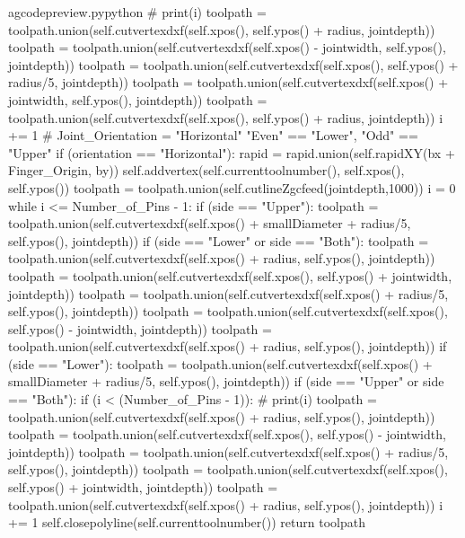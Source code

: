 \documentclass{ltxdoc}
\begin{document}
\begin{writecode}{a}{gcodepreview.py}{python}
    #                    print(i)
                        toolpath = toolpath.union(self.cutvertexdxf(self.xpos(), self.ypos() + radius, jointdepth))
                        toolpath = toolpath.union(self.cutvertexdxf(self.xpos() - jointwidth, self.ypos(), jointdepth))
                        toolpath = toolpath.union(self.cutvertexdxf(self.xpos(), self.ypos() + radius/5, jointdepth))
                        toolpath = toolpath.union(self.cutvertexdxf(self.xpos() + jointwidth, self.ypos(), jointdepth))
                        toolpath = toolpath.union(self.cutvertexdxf(self.xpos(), self.ypos() + radius, jointdepth))
                i += 1
    # Joint_Orientation = "Horizontal" "Even" == "Lower", "Odd" == "Upper"
        if (orientation == "Horizontal"):
            rapid = rapid.union(self.rapidXY(bx + Finger_Origin, by))
            self.addvertex(self.currenttoolnumber(), self.xpos(), self.ypos())
            toolpath = toolpath.union(self.cutlineZgcfeed(jointdepth,1000))
            i = 0
            while i <= Number_of_Pins - 1:
                if (side == "Upper"):
                    toolpath = toolpath.union(self.cutvertexdxf(self.xpos() + smallDiameter + radius/5, self.ypos(), jointdepth))
                if (side == "Lower" or side == "Both"):
                    toolpath = toolpath.union(self.cutvertexdxf(self.xpos() + radius, self.ypos(), jointdepth))
                    toolpath = toolpath.union(self.cutvertexdxf(self.xpos(), self.ypos() + jointwidth, jointdepth))
                    toolpath = toolpath.union(self.cutvertexdxf(self.xpos() + radius/5, self.ypos(), jointdepth))
                    toolpath = toolpath.union(self.cutvertexdxf(self.xpos(), self.ypos() - jointwidth, jointdepth))
                    toolpath = toolpath.union(self.cutvertexdxf(self.xpos() + radius, self.ypos(), jointdepth))
                if (side == "Lower"):
                    toolpath = toolpath.union(self.cutvertexdxf(self.xpos() + smallDiameter + radius/5, self.ypos(), jointdepth))
                if (side == "Upper" or side == "Both"):
                    if (i < (Number_of_Pins - 1)):
    #                    print(i)
                        toolpath = toolpath.union(self.cutvertexdxf(self.xpos() + radius, self.ypos(), jointdepth))
                        toolpath = toolpath.union(self.cutvertexdxf(self.xpos(), self.ypos() - jointwidth, jointdepth))
                        toolpath = toolpath.union(self.cutvertexdxf(self.xpos() + radius/5, self.ypos(), jointdepth))
                        toolpath = toolpath.union(self.cutvertexdxf(self.xpos(), self.ypos() + jointwidth, jointdepth))
                        toolpath = toolpath.union(self.cutvertexdxf(self.xpos() + radius, self.ypos(), jointdepth))
                i += 1
        self.closepolyline(self.currenttoolnumber())
        return toolpath


\end{writecode}
\end{document}
